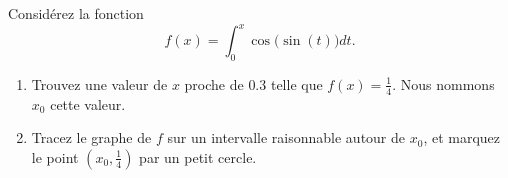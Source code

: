 \begin{exercice}\label{exoMatlab0013}

	Considérez la fonction
	\begin{equation}
		f(x)=\int_0^x\cos\big( \sin(t) \big)dt.
	\end{equation}
	\begin{enumerate}

		\item
			Trouvez une valeur de $x$ proche de $0.3$ telle que $f(x)=\frac{1}{ 4 }$. Nous nommons $x_0$ cette valeur.
		\item
			Tracez le graphe de $f$ sur un intervalle raisonnable autour de $x_0$, et marquez le point $(x_0,\frac{1}{ 4 })$ par un petit cercle.
			
	\end{enumerate}

\end{exercice}
